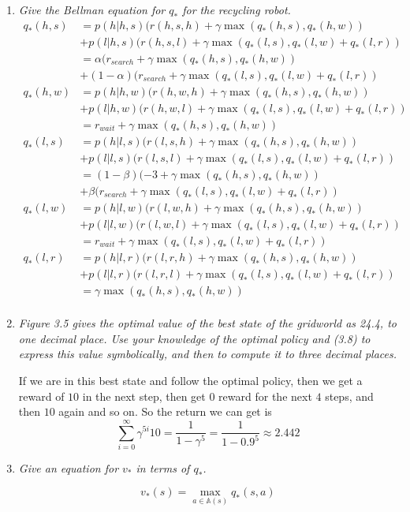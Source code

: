\documentclass[12pt,a4paper]{article}
\begin{document}
\begin{enumerate}
\item
  \textit{Give the Bellman equation for $q_\ast$ for the recycling robot.}
  \begin{align*}
    q_\ast(h, s) &= p(h|h, s) (r(h, s, h) + \gamma \max(q_\ast(h, s), q_\ast(h, w))\\
    & + p(l|h, s) (r(h, s, l) + \gamma \max(q_\ast(l, s), q_\ast(l, w) + q_\ast(l, r))\\
    & = \alpha(r_{search} + \gamma \max(q_\ast(h, s), q_\ast(h, w))\\
    & + (1 - \alpha)(r_{search} + \gamma \max(q_\ast(l, s), q_\ast(l, w) + q_\ast(l, r))\\
    q_\ast(h, w) &= p(h|h, w) (r(h, w, h) + \gamma \max(q_\ast(h, s), q_\ast(h, w))\\
    & + p(l|h, w) (r(h, w, l) + \gamma \max(q_\ast(l, s), q_\ast(l, w) + q_\ast(l, r))\\
    & = r_{wait} + \gamma \max(q_\ast(h, s), q_\ast(h, w))\\
    q_\ast(l, s) &= p(h|l, s) (r(l, s, h) + \gamma \max(q_\ast(h, s), q_\ast(h, w))\\
    & + p(l|l, s) (r(l, s, l) + \gamma \max(q_\ast(l, s), q_\ast(l, w) + q_\ast(l, r))\\
    & = (1 - \beta)(-3 + \gamma \max(q_\ast(h, s), q_\ast(h, w))\\
    & + \beta(r_{search} + \gamma \max(q_\ast(l, s), q_\ast(l, w) + q_\ast(l, r))\\
    q_\ast(l, w) &= p(h|l, w) (r(l, w, h) + \gamma \max(q_\ast(h, s), q_\ast(h, w))\\
    & + p(l|l, w) (r(l, w, l) + \gamma \max(q_\ast(l, s), q_\ast(l, w) + q_\ast(l, r))\\
    & = r_{wait} + \gamma \max(q_\ast(l, s), q_\ast(l, w) + q_\ast(l, r))\\
    q_\ast(l, r) &= p(h|l, r) (r(l, r, h) + \gamma \max(q_\ast(h, s), q_\ast(h, w))\\
    & + p(l|l, r) (r(l, r, l) + \gamma \max(q_\ast(l, s), q_\ast(l, w) + q_\ast(l, r))\\
    & = \gamma \max(q_\ast(h, s), q_\ast(h, w))\\
  \end{align*}

\item
  \textit{Figure 3.5 gives the optimal value of the best state of the gridworld as
  24.4, to one decimal place. Use your knowledge of the optimal policy and (3.8) to express
  this value symbolically, and then to compute it to three decimal places.}

  If we are in this best state and follow the optimal policy, then we get a reward of $10$
  in the next step, then get $0$ reward for the next $4$ steps, and then $10$ again and so on.
  So the return we can get is
  \[\sum\limits_{i = 0}^{\infty} \gamma^{5i} 10 = \frac{1}{1 - \gamma^5} = \frac{1}{1 - 0.9^5} \approx 2.442\]

\item
  \textit{Give an equation for $v_\ast$ in terms of $q_\ast$.}

  \[v_\ast(s) = \max_{a \in \mathbb{A}(s)} q_\ast(s, a)\]


\end{enumerate}
\end{document}

